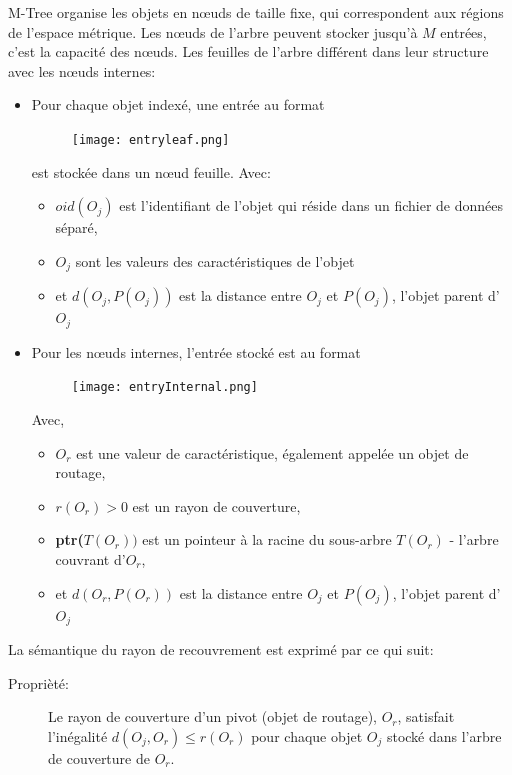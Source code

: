 M-Tree organise les objets en nœuds de taille fixe, qui correspondent aux régions de l'espace métrique. Les nœuds de l'arbre peuvent stocker jusqu'à \textbf{$ M $} entrées, c'est la capacité des nœuds. Les feuilles de l’arbre différent dans leur structure avec les nœuds internes:
\begin{itemize}
	\item Pour chaque objet indexé, une entrée au format 
	\begin{figure}[H]
		\centering
		\texttt{[image: entryleaf.png]} %
	\end{figure} 
	est stockée dans un nœud feuille. Avec:
	\begin{itemize}
		\item \textbf{$ oid(O_j) $} est l'identifiant de l'objet qui réside dans un fichier de données séparé,
		\item \textbf{$ O_j $} sont les valeurs des caractéristiques de l'objet 
		\item et \textbf{$ d(O_j, P(O_j)) $} est la distance entre \textbf{$ O_j $} et \textbf{$ P(O_j) $}, l'objet parent d'\textbf{$ O_j $}
	\end{itemize}

	\item Pour les nœuds internes, l'entrée stocké est au format
	\begin{figure}[H]
		\centering
		\texttt{[image: entryInternal.png]} %
	\end{figure} 
	Avec,
	\begin{itemize}
		\item \textbf{$ O_r $} est une valeur de caractéristique, également appelée un objet de routage,
		\item \textbf{$ r(O_r) $}$>0$ est un rayon de couverture, 
		\item \textbf{ptr($ T( O_r)) $} est un pointeur à la racine du sous-arbre \textbf{$ T(O_r) $} - l'arbre couvrant d'\textbf{$ O_r $}, 
		\item et \textbf{$ d(O_r, P(O_r)) $} est la distance entre \textbf{$ O_j $} et \textbf{$ P(O_j) $}, l'objet parent d'\textbf{$ O_j $}\\
		
	\end{itemize}
\end{itemize}


La sémantique du rayon de recouvrement est exprimé par ce qui suit:
\begin{description}
	\item[Proprièté:] Le rayon de couverture d'un pivot (objet de routage), $ O_r $, satisfait l'inégalité $ d(O_j, O_r) \le r(O_r) $ pour chaque objet $ O_j $ stocké dans l'arbre de couverture de $ O_r $.
\end{description}

